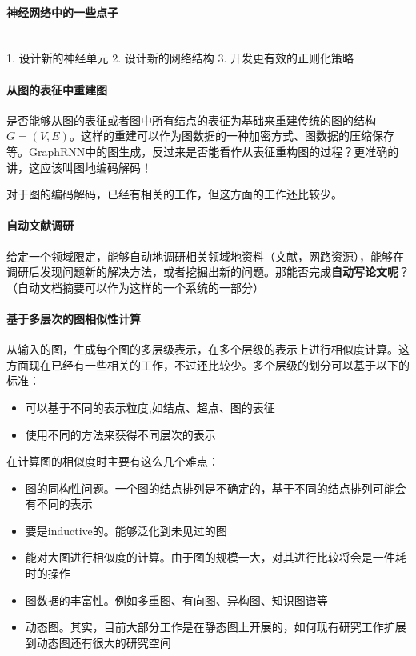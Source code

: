 \paragraph{神经网络中的一些点子}\\1. 设计新的神经单元
2. 设计新的网络结构
3. 开发更有效的正则化策略

\paragraph{从图的表征中重建图} 是否能够从图的表征或者图中所有结点的表征为基础来重建传统的图的结构$G = (V, E) $。这样的重建可以作为图数据的一种加密方式、图数据的压缩保存等。GraphRNN\cite{you2018graphrnn}中的图生成，反过来是否能看作从表征重构图的过程？{\color{red}更准确的讲，这应该叫图地编码解码！}

对于图的编码解码，已经有相关的工作\cite{simonovsky2018graphvae}，但这方面的工作还比较少。

\paragraph{自动文献调研} 给定一个领域限定，能够自动地调研相关领域地资料（文献，网路资源），能够在调研后发现问题新的解决方法，或者挖掘出新的问题。那能否完成\textbf{自动写论文呢}\cite{wang-etal-2019-paperrobot}？（自动文档摘要可以作为这样的一个系统的一部分）

\paragraph{基于多层次的图相似性计算}从输入的图，生成每个图的多层级表示，在多个层级的表示上进行相似度计算。这方面现在已经有一些相关的工作，不过还比较少。多个层级的划分可以基于以下的标准：
\begin{itemize}
	\item 可以基于不同的表示粒度,如结点、超点、图的表征
	\item 使用不同的方法来获得不同层次的表示
\end{itemize}
在计算图的相似度时主要有这么几个难点：
\begin{itemize}
	\item 图的同构性问题。一个图的结点排列是不确定的，基于不同的结点排列可能会有不同的表示
	\item 要是inductive的。能够泛化到未见过的图
	\item 能对大图进行相似度的计算。由于图的规模一大，对其进行比较将会是一件耗时的操作
	\item {\color{red}图数据的丰富性}。例如多重图、有向图、异构图、知识图谱等
	\item {\color{red}动态图}。其实，目前大部分工作是在静态图上开展的，如何现有研究工作扩展到动态图还有很大的研究空间
\end{itemize}


